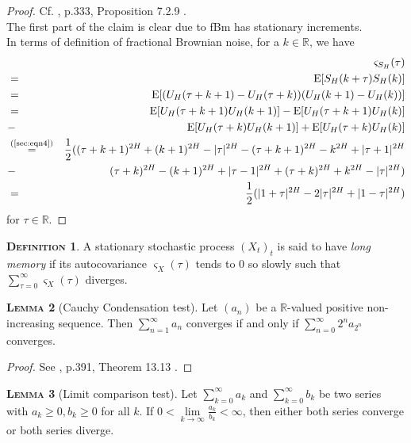 \documentclass[a4paper, twoside, 11pt]{article}
\theoremstyle{definition}
\newtheorem{definition}{\scshape Definition}[section]
\newtheorem{lemma}[definition]{\scshape Lemma}
\begin{document}
\begin{proof}
  Cf. \cite{nourdin}, p.333, Proposition 7.2.9 .\\
  The first part of the claim is clear due to fBm has stationary increments.\\
  In terms of definition of fractional Brownian noise, for a $k \in \mathbb{R}$, we have
  \begin{eqnarray*}
	&&\varsigma_{S_H}(\tau)\\
	&=& \mathrm{E}[S_H(k+\tau)S_H(k)] \\
	&=& \mathrm{E}[(U_H(\tau+k+1) - U_H(\tau+k))(U_H(k+1)-U_H(k))]\\
	&=& \mathrm{E}[U_H(\tau+k+1)U_H(k+1)] - \mathrm{E}[U_H(\tau+k+1)U_H(k)] \\
	&-& \mathrm{E}[U_H(\tau+k)U_H(k+1)] + \mathrm{E}[U_H(\tau+k)U_H(k)]\\
	&\overset{\text{(\ref{sec:eqn4})}}{=}& \frac{1}{2} ( (\tau+k+1)^{2H} + (k+1)^{2H} - |\tau|^{2H} - (\tau+k+1)^{2H} - k^{2H} + |\tau+1|^{2H}\\
	&-& (\tau+k)^{2H} - (k+1)^{2H} + |\tau-1|^{2H}+ (\tau+k)^{2H} + k^{2H} - |\tau|^{2H})\\
	&=& \frac{1}{2}(|1+\tau|^{2H} - 2|\tau|^{2H} + |1-\tau|^{2H})
  \end{eqnarray*}
  for $\tau \in \mathbb{R}$.
\end{proof}


\begin{definition}
  A stationary stochastic process $(X_t)_t$ is said to have \emph{long memory} if its autocovariance $\varsigma_X(\tau)$ tends to $0$ so slowly such that
  $ \sum_{\tau = 0} ^{\infty} \varsigma_X(\tau)$ diverges.
\end{definition}

\begin{lemma}[Cauchy Condensation test]
  Let $(a_n)$ be a $\mathbb{R}$-valued positive non-increasing sequence. Then $\sum_{n=1}^{\infty} a_n$ converges if and only if $\sum_{n=0}^{\infty} 2^n a_{2^n}$ converges.
  \label{sec:cauchy}
\end{lemma}
\begin{proof}
  See \cite{michael}, p.391, Theorem 13.13 .
\end{proof}

\begin{lemma}[Limit comparison test]
  Let $\sum_{k=0}^{\infty} a_k$ and $\sum_{k=0}^{\infty} b_k$ be two series with $a_k \ge 0, b_k \ge 0$ for all $k$. If $0 <\lim\limits_{k\rightarrow \infty}\frac{a_k}{b_k} < \infty$, then either both series converge or both series diverge.
\end{lemma}
\end{document}

